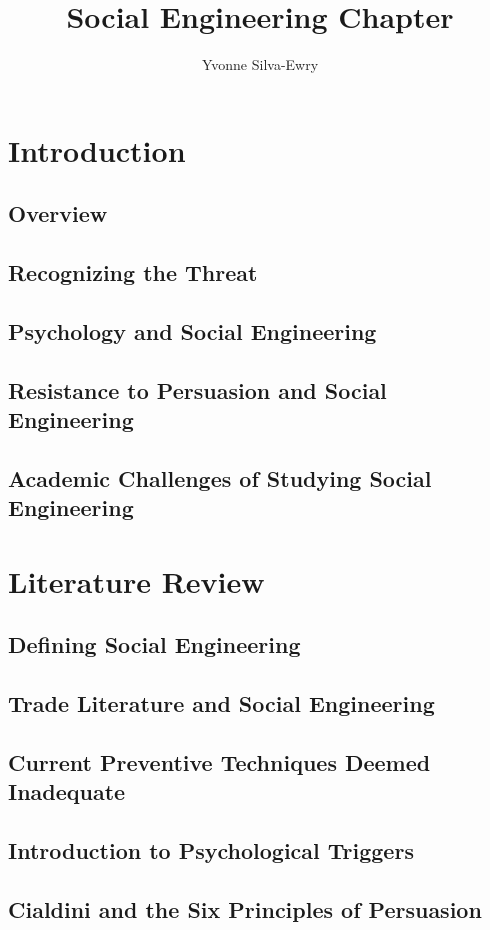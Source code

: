 \documentclass{article}
\title{Social Engineering Chapter}
\author{Yvonne Silva-Ewry}
\date{ }
\begin{document}
\maketitle

\tableofcontents

\section{Introduction}
\subsection{Overview}
\subsection{Recognizing the Threat}
\subsection{Psychology and Social Engineering}
\subsection{Resistance to Persuasion and Social Engineering}
\subsection{Academic Challenges of Studying Social Engineering}
\section{Literature Review}
\subsection{Defining Social Engineering}
\subsection{Trade Literature and Social Engineering}
\subsection{Current Preventive Techniques Deemed Inadequate}
\subsection{Introduction to Psychological Triggers}
\subsection{Cialdini and the Six Principles of Persuasion}
\end{document}
